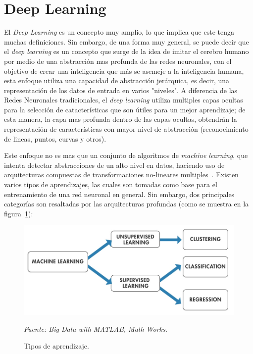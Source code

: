 \section{Deep Learning}
\label{sec:deep-learning}
El \textit{Deep Learning} es un concepto muy amplio, lo que implica que este tenga muchas definiciones. Sin embargo, de una forma muy general, se puede decir que el \textit{deep learning} es un concepto que surge de la idea de imitar el cerebro humano por medio de una abstracción mas profunda de las redes neuronales, con el objetivo de crear una inteligencia que más se asemeje a la inteligencia humana, esta enfoque utiliza una capacidad de abstracción jerárquica, es decir, una representación de los datos de entrada en varios "niveles". A diferencia de las Redes Neuronales tradicionales, el \textit{deep learning} utiliza multiples capas ocultas para la selección de catacterísticas que son útiles para un mejor aprendizaje; de esta manera, la capa mas profunda dentro de las capas ocultas, obtendrán la representación de características con mayor nivel de abstracción (reconocimiento de lineas, puntos, curvas y otros).

Este enfoque no es mas que un conjunto de algoritmos de \textit{machine learning}, que intenta detectar abstracciones de un alto nivel en datos, haciendo uso de arquitecturas compuestas de transformaciones no-lineares multiples~\cite{17bengio2013representation}. Existen varios tipos de aprendizajes, las cuales son tomadas como base para el entrenamiento de una red neuronal en general. Sin embargo, dos principales categorías son resaltadas por las arquitecturas profundas (como se muestra en la figura~\ref{fig:aprendizajes}):

\begin{figure}[H]
		\centering
		\includegraphics[width=130mm]{Imagenes/aprendizaje_tipos.jpg}
		\caption{Tipos de aprendizaje.}
		\vspace{0.15cm}
		\textit{Fuente: Big Data with MATLAB, Math Works.}
		\label{fig:aprendizajes}
\end{figure}

